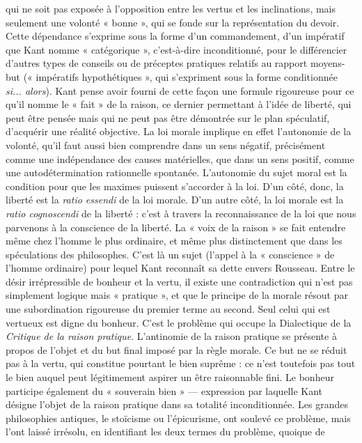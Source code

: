 qui ne soit pas exposée à l’opposition
entre les vertus et les inclinations, mais
seulement une volonté « bonne », qui se
fonde sur la représentation du devoir.
Cette dépendance s'exprime sous la
forme d’un commandement, d’un impératif
que Kant nomme « catégorique »,
c’est-à-dire inconditionné, pour le différencier
d’autres types de conseils ou de
préceptes pratiques relatifs au rapport
moyens-but (« impératifs hypothétiques »,
qui s’expriment sous la forme conditionnée
{\it si... alors}). Kant pense avoir fourni de
cette façon une formule rigoureuse pour
ce qu’il nomme le « fait » de la raison, ce
dernier permettant à l’idée de liberté, qui
peut être pensée mais qui ne peut pas être
démontrée sur le plan spéculatif, d’acquérir
une réalité objective. La loi morale
implique en effet l’autonomie de la
volonté, qu'il faut aussi bien comprendre
dans un sens négatif, précisément comme
une indépendance des causes matérielles,
que dans un sens positif, comme une
autodétermination rationnelle spontanée.
L’autonomie du sujet moral est la condition
pour que les maximes puissent s’accorder
à la loi. D’un côté, donc, la liberté
est la {\it ratio essendi} de la loi morale. D’un
autre côté, la loi morale est la {\it ratio
cognoscendi} de la liberté : c’est à travers
la reconnaissance de la loi que nous parvenons
à la conscience de la liberté. La
« voix de la raison » se fait entendre
même chez l’homme le plus ordinaire, et
même plus distinctement que dans les
spéculations des philosophes. C’est là un
sujet (l’appel à la « conscience » de
l’homme ordinaire) pour lequel Kant
reconnaît sa dette envers Rousseau.
Entre le désir irrépressible de bonheur
et la vertu, il existe une contradiction qui
n’est pas simplement logique mais « pratique »,
et que le principe de la morale
résout par une subordination rigoureuse
du premier terme au second. Seul celui
qui est vertueux est digne du bonheur.
C’est le problème qui occupe la Dialectique
de la {\it Critique de la raison pratique}.
L’antinomie de la raison pratique se présente
à propos de l’objet et du but final
imposé par la règle morale. Ce but ne se
réduit pas à la vertu, qui constitue pourtant
le bien suprême : ce n’est toutefois
pas tout le bien auquel peut légitimement
aspirer un être raisonnable fini. Le bonheur
participe également du « souverain
bien » — expression par laquelle Kant
désigne l’objet de la raison pratique dans
sa totalité inconditionnée. Les grandes
philosophies antiques, le stoïcisme ou
l’épicurisme, ont soulevé ce problème,
mais l’ont laissé irrésolu, en identifiant les
deux termes du problème, quoique de
